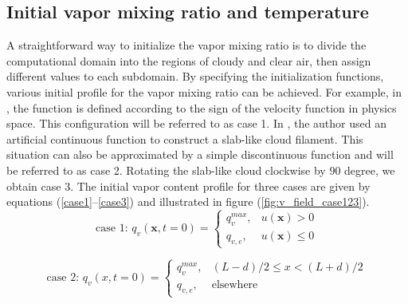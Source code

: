 \documentclass[draft,jgrga]{AGUTeX}
\begin{document}
\begin{article}
\subsection{Initial vapor mixing ratio and temperature}
A straightforward way to initialize the vapor mixing ratio is to divide the computational domain into the regions of cloudy and clear air, then assign different values to each subdomain. By specifying the initialization functions, various initial profile for the vapor mixing ratio can be achieved. For example, in \cite{And04}, the function is defined according to the sign of the velocity function in physics space. This configuration will be referred to as case 1. In \cite{Kumar11}, the author used an artificial continuous function to construct a slab-like cloud filament. This situation can also be approximated by a simple discontinuous function and will be referred to as case 2. Rotating the slab-like cloud clockwise by $90$ degree, we obtain case 3. The initial vapor content profile for three cases are given by equations (\ref{case1}--\ref{case3}) and illustrated in figure (\ref{fig:v_field_case123}).
\begin{equation}
\mbox{case 1: } q_v(\mathbf{x},t=0) = 
\begin{cases} 
q_v^{max}, & u(\mathbf{x}) > 0\\
q_{v,e}, & u(\mathbf{x}) \le 0
\end{cases}\label{case1}
\end{equation}

\begin{equation}
\mbox{case 2: } q_v(x,t=0) = 
\begin{cases} 
q_v^{max}, & (L-d)/2 \le x < (L+d)/2\\
q_{v,e}, & \mbox{elsewhere}
\end{cases}\label{case2}
\end{equation}


\end{article}
\end{document}
